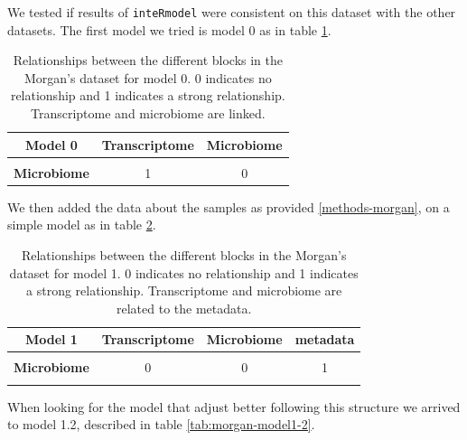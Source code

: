 \documentclass[
  12pt,
  a4paper,
  twoside,
  openright]{book}
\begin{document}
We tested if results of \texttt{inteRmodel} were consistent on this dataset with the other datasets.
The first model we tried is model 0 as in table \ref{tab:morgan-model0}.

\begin{table}[H]

\caption[Model 0 of the Morgan's dataset.]{\label{tab:morgan-model0}Relationships between the different blocks in the Morgan's dataset for model 0. 0 indicates no relationship and 1 indicates a strong relationship. Transcriptome and microbiome are linked.}
\centering
\begin{tabular}[t]{>{}c|c|c}
\hline
\textbf{Model 0} & \textbf{Transcriptome} & \textbf{Microbiome}\\
\hline
\textbf{\cellcolor{gray!6}{Transcriptome}} & \cellcolor{gray!6}{0} & \cellcolor{gray!6}{1}\\
\hline
\textbf{Microbiome} & 1 & 0\\
\hline
\end{tabular}
\end{table}

We then added the data about the samples as provided \ref{methods-morgan}, on a simple model as in table \ref{tab:morgan-model1}.

\begin{table}[H]

\caption[Model 1 of the Morgan's dataset.]{\label{tab:morgan-model1}Relationships between the different blocks in the Morgan's dataset for model 1. 0 indicates no relationship and 1 indicates a strong relationship. Transcriptome and microbiome are related to the metadata.}
\centering
\begin{tabular}[t]{>{}c|c|c|c}
\hline
\textbf{Model 1} & \textbf{Transcriptome} & \textbf{Microbiome} & \textbf{metadata}\\
\hline
\textbf{\cellcolor{gray!6}{Transcriptome}} & \cellcolor{gray!6}{0} & \cellcolor{gray!6}{0} & \cellcolor{gray!6}{1}\\
\hline
\textbf{Microbiome} & 0 & 0 & 1\\
\hline
\textbf{\cellcolor{gray!6}{metadata}} & \cellcolor{gray!6}{1} & \cellcolor{gray!6}{1} & \cellcolor{gray!6}{0}\\
\hline
\end{tabular}
\end{table}

When looking for the model that adjust better following this structure we arrived to model 1.2, described in table \ref{tab:morgan-model1-2}.
\end{document}
